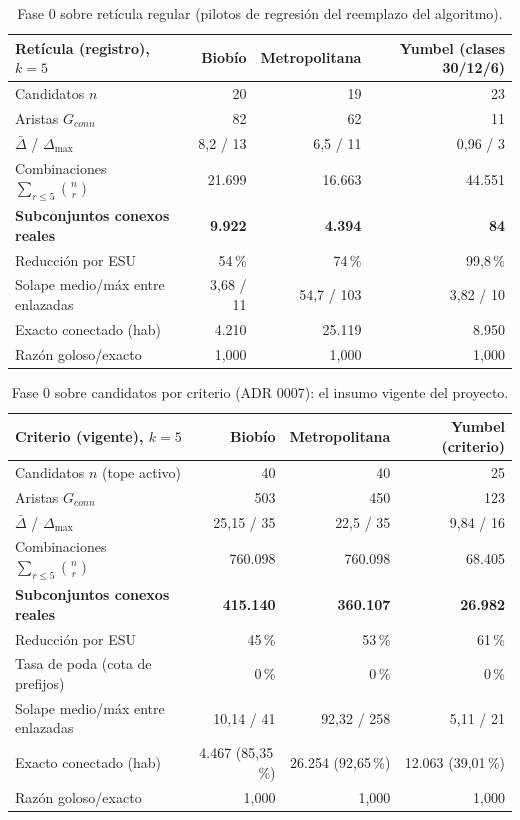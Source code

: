 \documentclass[12pt,letterpaper]{article}
\begin{document}
\begin{table}[H]
\centering\small
\begin{tabular}{lrrr}
\toprule
\textbf{Retícula (registro), $k=5$} & \textbf{Biobío} & \textbf{Metropolitana} & \textbf{Yumbel (clases 30/12/6)} \\
\midrule
Candidatos $n$ & 20 & 19 & 23 \\
Aristas $G_{conn}$ & 82 & 62 & 11 \\
$\bar{\Delta}$ / $\Delta_{\max}$ & 8,2 / 13 & 6,5 / 11 & 0,96 / 3 \\
Combinaciones $\sum_{r\le 5}\binom{n}{r}$ & 21.699 & 16.663 & 44.551 \\
\textbf{Subconjuntos conexos reales} & \textbf{9.922} & \textbf{4.394} & \textbf{84} \\
Reducción por ESU & 54\,\% & 74\,\% & 99,8\,\% \\
Solape medio/máx entre enlazadas & 3,68 / 11 & 54,7 / 103 & 3,82 / 10 \\
Exacto conectado (hab) & 4.210 & 25.119 & 8.950 \\
Razón goloso/exacto & 1,000 & 1,000 & 1,000 \\
\bottomrule
\end{tabular}
\caption{Fase 0 sobre retícula regular (pilotos de regresión del reemplazo del algoritmo).}
\label{tab:fase0-grilla}
\end{table}

\begin{table}[H]
\centering\small
\begin{tabular}{lrrr}
\toprule
\textbf{Criterio (vigente), $k=5$} & \textbf{Biobío} & \textbf{Metropolitana} & \textbf{Yumbel (criterio)} \\
\midrule
Candidatos $n$ (tope activo) & 40 & 40 & 25 \\
Aristas $G_{conn}$ & 503 & 450 & 123 \\
$\bar{\Delta}$ / $\Delta_{\max}$ & 25,15 / 35 & 22,5 / 35 & 9,84 / 16 \\
Combinaciones $\sum_{r\le 5}\binom{n}{r}$ & 760.098 & 760.098 & 68.405 \\
\textbf{Subconjuntos conexos reales} & \textbf{415.140} & \textbf{360.107} & \textbf{26.982} \\
Reducción por ESU & 45\,\% & 53\,\% & 61\,\% \\
Tasa de poda (cota de prefijos) & 0\,\% & 0\,\% & 0\,\% \\
Solape medio/máx entre enlazadas & 10,14 / 41 & 92,32 / 258 & 5,11 / 21 \\
Exacto conectado (hab) & 4.467 (85,35\,\%) & 26.254 (92,65\,\%) & 12.063 (39,01\,\%) \\
Razón goloso/exacto & 1,000 & 1,000 & 1,000 \\
\bottomrule
\end{tabular}
\caption{Fase 0 sobre candidatos por criterio (ADR 0007): el insumo vigente del proyecto.}
\label{tab:fase0-criterio}
\end{table}
\end{document}
